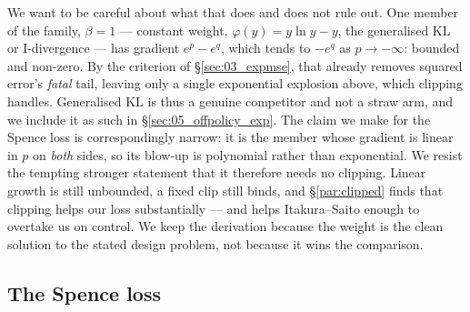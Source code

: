 We want to be careful about what that does and does not rule out. One member of
the family, $\beta=1$ --- constant weight, $\varphi(y)=y\ln y-y$, the
generalised KL or I-divergence --- has gradient $e^{p}-e^{q}$, which tends to
$-e^{q}$ as $p\to-\infty$: bounded and non-zero. By the criterion of
\S\ref{sec:03_expmse}, that already removes squared error's \emph{fatal}
tail, leaving only a single exponential explosion above, which clipping
handles. Generalised KL is thus a genuine competitor and not a straw arm, and
we include it as such in \S\ref{sec:05_offpolicy_exp}. The claim we make for
the Spence loss is correspondingly narrow: it is the member whose gradient is
linear in $p$ on \emph{both} sides, so its blow-up is polynomial rather than
exponential. We resist the tempting stronger statement that it therefore needs
no clipping. Linear growth is still unbounded, a fixed clip still binds, and
\S\ref{par:clipped} finds that clipping helps our loss substantially --- and
helps Itakura--Saito enough to overtake us on control. We keep the derivation
because the weight is the clean solution to the stated design problem, not
because it wins the comparison.

\subsection{The Spence loss}
\label{subsec:spence}

